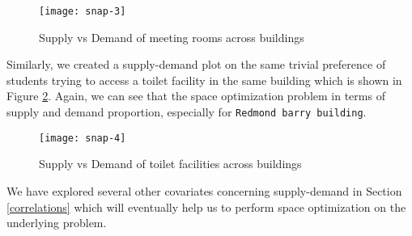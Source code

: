 \begin{figure}[H]
\centering
\texttt{[image: snap-3]}
\caption{Supply vs Demand of meeting rooms across buildings}
\label{fig:expo-image-3}
\end{figure}

 Similarly, we created a supply-demand plot on the same trivial preference of students trying to access a toilet facility in the same building which is shown in Figure \ref{fig:expo-image-4}. Again, we can see that the space optimization problem in terms of supply and demand proportion, especially for \texttt{Redmond barry building}.
 
\begin{figure}[H]
\centering
\texttt{[image: snap-4]}
\caption{Supply vs Demand of toilet facilities across buildings}
\label{fig:expo-image-4}
\end{figure}

We have explored several other covariates concerning supply-demand in Section \ref{correlations} which will eventually help us to perform space optimization on the underlying problem.